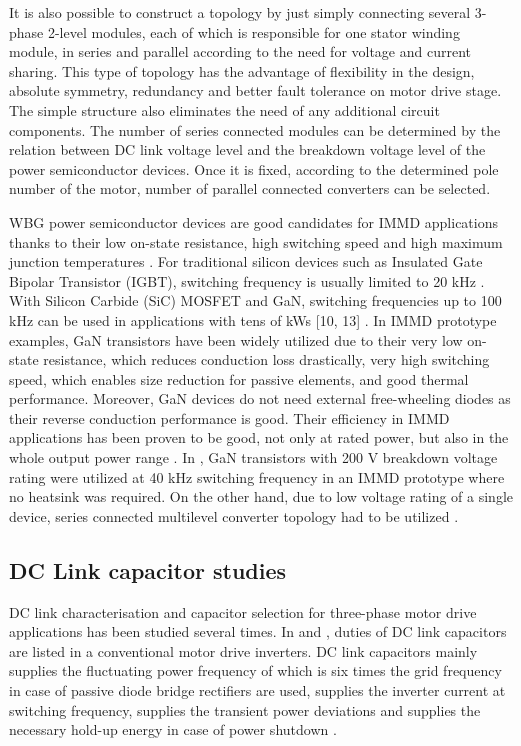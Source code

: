 \documentclass[conference,a4paper,twocolumn]{IEEEtran}
\begin{document}
It is also possible to construct a topology by just simply connecting several 3-phase 2-level modules, each of which is responsible for one stator winding module, in series and parallel according to the need for voltage and current sharing. This type of topology has the advantage of flexibility in the design, absolute symmetry, redundancy and better fault tolerance on motor drive stage. The simple structure also eliminates the need of any additional circuit components. The number of series connected modules can be determined by the relation between DC link voltage level and the breakdown voltage level of the power semiconductor devices. Once it is fixed, according to the determined pole number of the motor, number of parallel connected converters can be selected.

WBG power semiconductor devices are good candidates for IMMD applications thanks to their low on-state resistance, high switching speed and high maximum junction temperatures \cite{Morita2011}. For traditional silicon devices such as Insulated Gate Bipolar Transistor (IGBT), switching frequency is usually limited to 20 kHz \cite{Lambert2015a}. With Silicon Carbide (SiC) MOSFET and GaN, switching frequencies up to 100 kHz can be used in applications with tens of kWs [10, 13] \cite{Wang2015b,Morita2011}. In IMMD prototype examples, GaN transistors have been widely utilized due to their very low on-state resistance, which reduces conduction loss drastically, very high switching speed, which enables size reduction for passive elements, and good thermal performance. Moreover, GaN devices do not need external free-wheeling diodes as their reverse conduction performance is good. Their efficiency in IMMD applications has been proven to be good, not only at rated power, but also in the whole output power range \cite{Morita2011}. In \cite{Wang2015b}, GaN transistors with 200 V breakdown voltage rating were utilized at 40 kHz switching frequency in an IMMD prototype where no heatsink was required. On the other hand, due to low voltage rating of a single device, series connected multilevel converter topology had to be utilized \cite{Wang2013}.

\subsection{DC Link capacitor studies}

DC link characterisation and capacitor selection for three-phase motor drive applications has been studied several times. In \cite{Bianchi2003} and \cite{Lee2007}, duties of DC link capacitors are listed in a conventional motor drive inverters. DC link capacitors mainly supplies the fluctuating power frequency of which is six times the grid frequency in case of passive diode bridge rectifiers are used, supplies the inverter current at switching frequency, supplies the transient power deviations and supplies the necessary hold-up energy in case of power shutdown \cite{Bianchi2003}.
\end{document}
